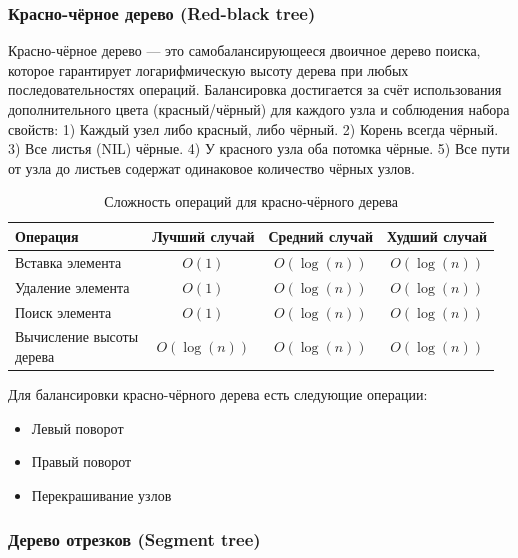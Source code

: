 \documentclass[a4paper,12pt]{article}
\begin{document}
\subsubsection{Красно-чёрное дерево (Red-black tree)}
\label{subsubsec:красно-чёрное-дерево-red-black-tree}

Красно-чёрное дерево --- это самобалансирующееся двоичное дерево поиска, которое гарантирует логарифмическую высоту дерева при любых последовательностях операций. Балансировка достигается за счёт использования дополнительного цвета (красный/чёрный) для каждого узла и соблюдения набора свойств: 1) Каждый узел либо красный, либо чёрный. 2) Корень всегда чёрный. 3) Все листья (NIL) чёрные. 4) У красного узла оба потомка чёрные. 5) Все пути от узла до листьев содержат одинаковое количество чёрных узлов.

\begin{table}[H]
    \centering
    \begin{tabular}{|l|c|c|c|}
        \hline
        Операция & Лучший случай & Средний случай & Худший случай \\
        \hline
        Вставка элемента & $O(1)$ & $O(\log(n))$ & $O(\log(n))$ \\
        \hline
        Удаление элемента & $O(1)$ & $O(\log(n))$ & $O(\log(n))$ \\
        \hline
        Поиск элемента & $O(1)$ & $O(\log(n))$ & $O(\log(n))$ \\
        \hline
        \makecell[l]{Вычисление высоты \\дерева} & $O(\log(n))$ & $O(\log(n))$ & $O(\log(n))$ \\
        \hline
    \end{tabular}
    \caption{Сложность операций для красно-чёрного дерева}
\end{table}

Для балансировки красно-чёрного дерева есть следующие операции:

\begin{itemize}
    \item Левый поворот
    \item Правый поворот
    \item Перекрашивание узлов
\end{itemize}

\subsubsection{Дерево отрезков (Segment tree)}
\label{subsubsec:дерево-отрезков-segment-tree}
\end{document}
